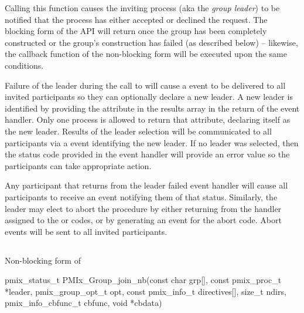 Calling this function causes the inviting process (aka the \emph{group leader}) to be notified that the process has either accepted or declined the request. The blocking form of the \ac{API} will return once the group has been completely constructed or the group’s construction has failed (as described below) – likewise, the callback function of the non-blocking form will be executed upon the same conditions.

Failure of the leader during the call to  will cause a  event to be delivered to all invited participants so they can optionally declare a new leader. A new leader is identified by providing the  attribute in the results array in the return of the event handler. Only one process is allowed to return that attribute, declaring itself as the new leader. Results of the leader selection will be communicated to all participants via a  event identifying the new leader. If no leader was selected, then the status code provided in the event handler will provide an error value so the participants can take appropriate action.

Any participant that returns  from the leader failed event handler will cause all participants to receive an event notifying them of that status. Similarly, the leader may elect to abort the procedure by either returning  from the handler assigned to the  or  codes, or by generating an event for the abort code. Abort events will be sent to all invited participants.


\subsection{}

\summary

Non-blocking form of 

\format

\cspecificstart
\begin{codepar}
pmix_status_t
PMIx_Group_join_nb(const char grp[],
                   const pmix_proc_t *leader,
                   pmix_group_opt_t opt,
                   const pmix_info_t directives[], size_t ndirs,
                   pmix_info_cbfunc_t cbfunc, void *cbdata)
\end{codepar}
\cspecificend

